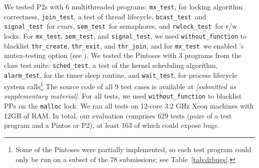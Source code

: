 \newcommand\mxtest{\texttt{mx\_test}}
\newcommand\tej{\texttt{join\_test}}
\newcommand\bct{\texttt{bcast\_test}}
\newcommand\paraguay{\texttt{signal\_test}}
\newcommand\paradise{\texttt{sem\_test}}
\newcommand\rwldgr{\texttt{rwlock\_test}}
We tested P2s with 6 multithreaded programs:
\mxtest, for locking algorithm correctness,
\tej, a test of thread lifecycle,
\bct~and \paraguay~for cvars,
\paradise~for semaphores,
and \rwldgr~for r/w locks.
For \mxtest, \paradise, and \paraguay, we used {\tt without\_function} to blacklist {\tt thr\_create}, {\tt thr\_exit}, and {\tt thr\_join},
and for \mxtest~we enabled \landslide's mutex-testing option
(see \sect{\ref{sec:landslide}}).
\newcommand\prisema{\texttt{sched\_test}}
\newcommand\waitsimple{\texttt{wait\_test}}
\newcommand\alarmsimul{\texttt{alarm\_test}}
We tested the Pintoses with 3 programs from the class test suite: \prisema, a test of the kernel scheduling algorithm,
\alarmsimul, for the timer sleep routine,
and \waitsimple, for process lifecycle system calls\footnote{
	Some of the Pintoses were partially implemented, so each test program could only be run on a subset of the 78 submissions; see Table~\ref{tab:drbugs}.
}
The source code of all 9 test cases is available at
{\em [submitted as supplementary material]}.
For all tests, we used {\tt without\_function} to blacklist PPs on the {\tt malloc} lock.
We ran all tests on 12-core 3.2 GHz Xeon machines with 12GB of RAM.
In total, our evaluation comprises 629 tests (pairs of a test program and a Pintos or P2),
at least 163 of which could expose bugs.

